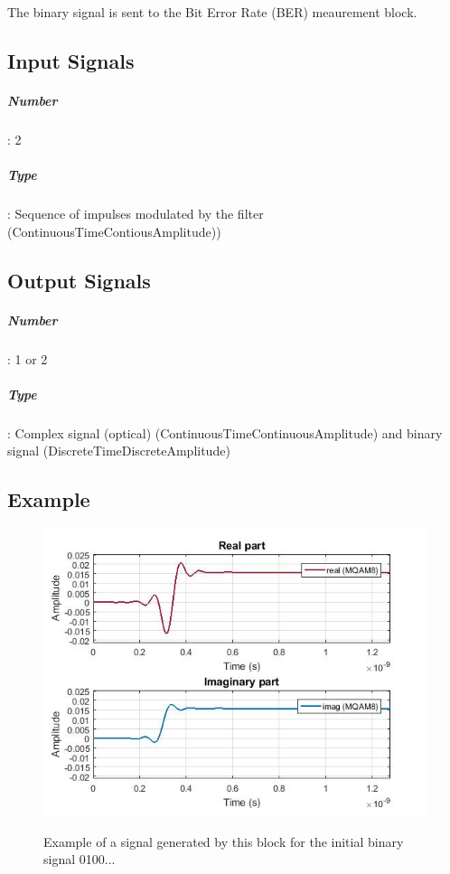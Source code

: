 The binary signal is sent to the Bit Error Rate (BER) meaurement block.

\subsection*{Input Signals}

\subparagraph*{Number}: 2

\subparagraph*{Type}: Sequence of impulses modulated by the filter (ContinuousTimeContiousAmplitude))

\subsection*{Output Signals}

\subparagraph*{Number}: 1 or 2

\subparagraph*{Type}: Complex signal (optical) (ContinuousTimeContinuousAmplitude) and binary signal (DiscreteTimeDiscreteAmplitude)

\subsection*{Example}
\begin{figure}[h]
	\centering
	\includegraphics[width=\textwidth]{../m_qam_transmitter/figures/IQmodulator0_output}
	\label{MQAM8_DeterministicAppendZeros}\caption{Example of a signal generated by this block for the initial binary signal 0100...}
\end{figure}

